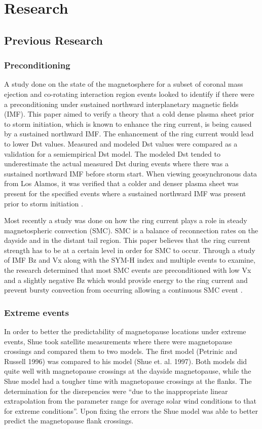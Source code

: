 \chapter[Research]{Research}

\section{Previous Research}
\subsection{Preconditioning}
A study done on the state of the magnetosphere for a subset of coronal mass
ejection and co-rotating interaction region events looked to identify if there
were a preconditioning under sustained northward interplanetary magnetic fields
(IMF). This paper aimed to verify a theory that a cold dense
plasma sheet prior to storm initiation, which is known to enhance the ring
current, is being caused by a sustained northward IMF. The enhancement of the
ring current would lead to lower Dst values. Measured and modeled Dst values were compared as
a validation for a semiempirical Dst model. The modeled Dst tended to
underestimate the actual measured Dst during events where there was a sustained
northward IMF before storm start. When viewing geosynchronous data from Los
Alamos, it was verified that a colder and denser plasma sheet was present for
the specified events where a sustained northward IMF was
present prior to storm initiation \cite{Lavraud2006}.

Most recently a study was done on how the ring current plays a role in steady
magnetospheric convection (SMC). SMC is a balance of reconnection rates on the
dayside and in the distant tail region. This paper believes that the ring
current strength has to be at a certain level in order for SMC to occur. Through
a study of IMF Bz and Vx along with the SYM-H index and multiple events to
examine, the research determined that most SMC events are preconditioned with
low Vx and a slightly negative Bz which would provide energy to the ring
current and prevent bursty convection from occurring allowing a continuous SMC
event \cite{Juusola2013}.
\subsection{Extreme events}
In order to better the predictability of magnetopause locations under extreme
events, \cite{Shue1998} Shue took satellite measurements where there were
magnetopause crossings and compared them to two models. The first model
(Petrinic and Russell 1996) was compared to his model (Shue et. al. 1997). Both
models did quite well with magnetopause crossings at the dayside magnetopause,
while the Shue model had a tougher time with magnetopause crossings at the
flanks. The determination for the disrepencies were ``due to the
inappropriate linear extrapolation from the parameter range for average
solar wind conditions to that for extreme conditions''. Upon fixing the errors
the Shue model was able to better predict the magnetopause flank crossings.

